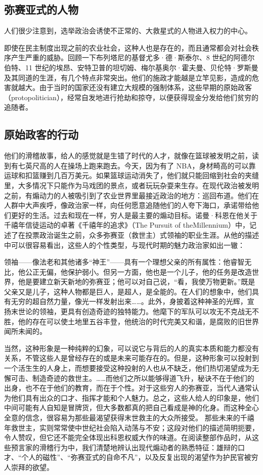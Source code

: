 \subsection{弥赛亚式的人物}
人们很少注意到，选举政治会诱使不正常的、大救星式的人物进入权力的中心。

即使在民主制度出现之前的农业社会，这种人也是存在的，而且通常都会对社会秩序产生严重的威胁。回顾一下布列塔尼的基督尤多·德·斯泰尔、8 世纪的阿德尔伯特、11 世纪的埃昂、安特卫普的坦切姆、梅尔基奥尔·霍夫曼、贝伦特·罗斯曼及其同道的生涯，有几个特点非常突出。他们的施政才能越是立竿见影，造成的危害就越大。由于当时的国家还没有建立大规模的强制体系，这些早期的原始政客（protopolitician），经常自发地进行抢劫和掠夺，以便获得现金分发给他们贫穷的追随者。

\subsection{原始政客的行动}
他们的滑稽故事，给人的感觉就是生错了时代的人才，就像在篮球被发明之前，读到有七英尺高的人在操场上跑来跑去。今天，因为有了 NBA，身材畸高的可以靠运球和扣篮赚到几百万美元。如果篮球运动消失了，他们就只能回缩到社会的夹缝里，大多情况下只能作为马戏团的景点，或者玩玩杂耍来生存。在现代政治被发明之前，有煽动力的人被吸引到了农业世界里最接近政治的地方：巡回布道。他们在人群中大声疾呼，像政治家一样，向任何愿意追随他们的人夸下海口，承诺带给他们更好的生活。过去和现在一样，穷人是最主要的煽动目标。诺曼·科恩在他关于千禧年信徒运动的卓著《千禧年的追求》（The Pursuit of theMillennium）中，记述了在投票政治诞生之前，众多弥赛亚（救世主）式领袖的职业生涯。从他的描述中可以很容易看出，这些人的个性类型，与现代时期的魅力政治家如出一辙：

领袖——像法老和其他诸多“神王”——具有一个理想父亲的所有属性：他睿智无比，他公正无偏，他保护弱小。但另一方面，他也是一个儿子，他的任务是改造世界，他是要建立新天新地的弥赛亚；他可以对自己说，“看，我使万物更新。”既是父亲又是儿子，这种人物都是巨人，是超人，是全能的。在人们的想象中，他们具有无穷的超自然力量，像光一样发射出来……。此外，身披着这种神圣的光辉，宣扬末世论的领袖，更具有创造奇迹的独特能力。他麾下的军队可以攻无不克战无不胜，他的存在可以使土地里五谷丰登，他统治的时代完美又和谐，是腐败的旧世界闻所未闻的。

当然，这种形象是一种纯粹的幻象，可以说它与背后的人的真实本质和能力都没有关系，不管这些人是曾经存在的或是未来可能存在的。但是，这种形象可以投射到一个活生生的人身上，而想要接受这种投射的人也从不缺乏，他们热切渴望成为无懈可击、制造奇迹的救世主。……而他们之所以能够得道飞升，秘诀不在于他们的出身，也不在于他们的教育，而在于个性。对于这些穷人的弥赛亚，当代人通常认为他们具有出众的口才、指挥才能和个人魅力。总之，这些人给人的印象是，他们中间可能有人自知是冒牌货，但大多数都真的把自己看成是神的化身。而这种全心全意的信念，很容易为那些最渴望获得末世救主的大众所接受。 那些未来的千禧年救世主，实则常常使中世纪社会陷入动荡与不安；这段对他们的描述简明扼要，令人赞叹，但它还不能完全体现出科恩权威大作的味道。在阅读整部作品时，从这些预言家的滑稽行为中，我们清楚地辨认出现代煽动者的熟悉特征：雄辩的口才、“个人的磁性”、“弥赛亚式的自命不凡”，以及反复出现的渴望作为护民官被穷人崇拜的欲望。

